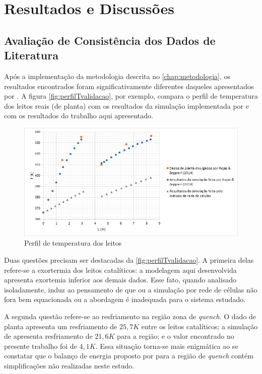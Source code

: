 %
% 
%
\chapter{Resultados e Discussões} \label{chap:resultados}

\section{Avaliação de Consistência dos Dados de Literatura}

Após a implementação da metodologia descrita no \autoref{chap:metodologia}, os
resultados encontrados foram significativamente diferentes daqueles apresentados
por . A figura \autoref{fig:perfilTvalidacao}, por
exemplo, compara o perfil de temperatura dos leitos reais (de planta) com os
resultados da simulação implementada por  e com os
resultados do trabalho aqui apresentado.

\begin{figure}[htb]
\centering \includegraphics[scale=0.75]{images/Chap4/perfilTvalidacao.png}
\caption{Perfil de temperatura dos leitos}
\label{fig:perfilTvalidacao}
\end{figure}

Duas questões precisam ser destacadas da \autoref{fig:perfilTvalidacao}.
A primeira delas refere-se a exortermia dos leitos catalíticos: a modelagem aqui
desenvolvida apresenta exortemia inferior aos demais dados. Esse fato, quando
analisado isoladamente, induz ao pensamento de que ou a simulação
por rede de células não fora bem equacionada ou a abordagem é inadequada para o
sistema estudado.

A segunda questão refere-se ao resfriamento na região zona de \emph{quench}. O
dado de planta apresenta um resfriamento de $25,7 K$ entre os leitos
catalíticos; a simulação de  apresenta resfriamento de
$21,6 K$ para a região; e o valor encontrado no presente trabalho foi de $4,1
K$. Essa situação torna-se mais enigmática ao se constatar que o balanço de
energia proposto por  para a região de \emph{quench}
contém simplificações não realizadas neste estudo.


